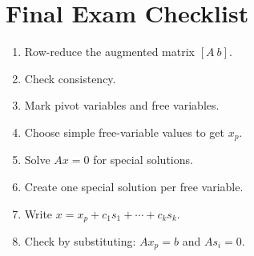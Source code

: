 \documentclass[10pt]{article}
\begin{document}
\section{Final Exam Checklist}

\begin{enumerate}
  \item Row-reduce the augmented matrix \([A\ b]\).
  \item Check consistency.
  \item Mark pivot variables and free variables.
  \item Choose simple free-variable values to get \(x_p\).
  \item Solve \(Ax=0\) for special solutions.
  \item Create one special solution per free variable.
  \item Write \(x=x_p+c_1s_1+\cdots+c_ks_k\).
  \item Check by substituting: \(Ax_p=b\) and \(As_i=0\).
\end{enumerate}
\end{document}
